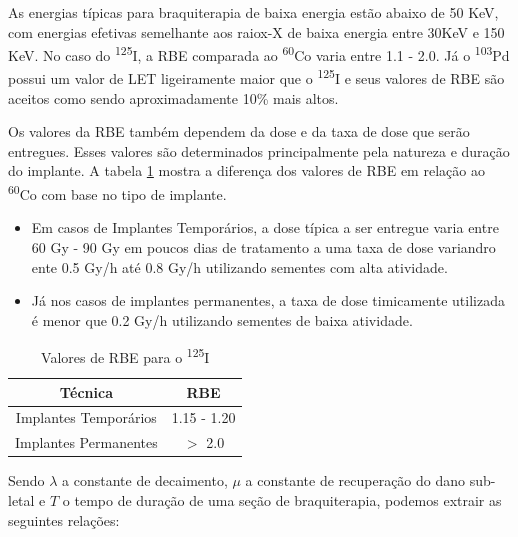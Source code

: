 \documentclass[11pt,a4paper]{article}
\begin{document}
			As energias típicas para braquiterapia de baixa energia estão abaixo de 50 KeV, com energias efetivas semelhante aos raiox-X de baixa energia entre 30KeV e 150 KeV. No caso do \textsuperscript{125}I, a RBE comparada ao \textsuperscript{60}Co varia entre 1.1 - 2.0. Já o \textsuperscript{103}Pd possui um valor de LET ligeiramente maior que o \textsuperscript{125}I e seus valores de RBE são aceitos como sendo aproximadamente 10\% mais altos.

			Os valores da RBE também dependem da dose e da taxa de dose que serão entregues. Esses valores são determinados principalmente pela natureza e duração do implante. A tabela \ref{tb:rbeI25} mostra a diferença dos valores de RBE em relação ao \textsuperscript{60}Co com base no tipo de implante.

				\begin{itemize}
					\item Em casos de \textcolor{CarnationPink}{Implantes Temporários}, a dose típica a ser entregue varia entre 60 Gy - 90 Gy em poucos dias de tratamento a uma taxa de dose variandro ente 0.5 Gy/h até 0.8 Gy/h utilizando sementes com alta atividade.
					\item Já nos casos de \textcolor{CarnationPink}{implantes permanentes}, a taxa de dose timicamente utilizada é menor que 0.2 Gy/h utilizando sementes de baixa atividade.
				\end{itemize}

				\begin{table}[h]
					\centering
					\caption{Valores de RBE para o \textsuperscript{125}I}
					\label{tb:rbeI25}
					\begin{tabular}{c c}
					\toprule
					Técnica & RBE \\
					\midrule[1.5pt]
					Implantes Temporários & 1.15 - 1.20 \\
					Implantes Permanentes & $>$ 2.0 \\
					\bottomrule
					\bottomrule
					\end{tabular}
				\end{table}

			Sendo $\lambda$ a constante de decaimento, $\mu$ a constante de recuperação do dano sub-letal e $T$ o tempo de duração de uma seção de braquiterapia, podemos extrair as seguintes relações:
			
\end{document}
